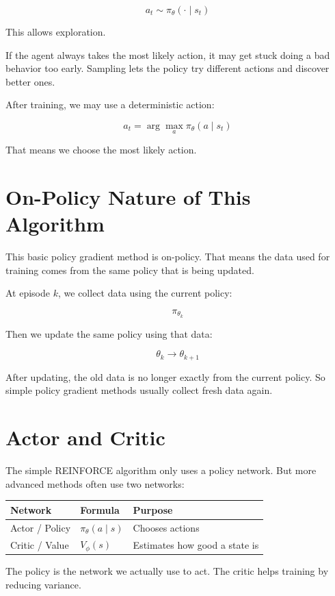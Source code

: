 \documentclass[11pt]{article}
\begin{document}
\[
 a_t \sim \pi_\theta(\cdot \mid s_t)
\]

This allows exploration.

If the agent always takes the most likely action, it may get stuck doing a bad behavior too early.
Sampling lets the policy try different actions and discover better ones.

After training, we may use a deterministic action:

\[
 a_t = \arg\max_a \pi_\theta(a \mid s_t)
\]

That means we choose the most likely action.

\section{On-Policy Nature of This Algorithm}

This basic policy gradient method is on-policy.
That means the data used for training comes from the same policy that is being updated.

At episode $k$, we collect data using the current policy:

\[
\pi_{\theta_k}
\]

Then we update the same policy using that data:

\[
\theta_k \rightarrow \theta_{k+1}
\]

After updating, the old data is no longer exactly from the current policy.
So simple policy gradient methods usually collect fresh data again.

\section{Actor and Critic}

The simple REINFORCE algorithm only uses a policy network.
But more advanced methods often use two networks:

\begin{center}
\begin{tabular}{lll}
\toprule
Network & Formula & Purpose \\
\midrule
Actor / Policy & $\pi_\theta(a \mid s)$ & Chooses actions \\
Critic / Value & $V_\phi(s)$ & Estimates how good a state is \\
\bottomrule
\end{tabular}
\end{center}

The policy is the network we actually use to act.
The critic helps training by reducing variance.
\end{document}
